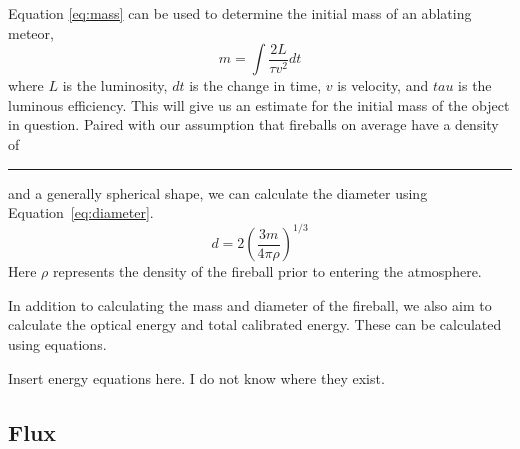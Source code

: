 Equation \ref{eq:mass} can be used to determine the initial mass of an ablating meteor,
\begin{equation}
m = \int \frac{2L}{\tau v^2} dt
\label{eq:mass}
\end{equation}
where $L$ is the luminosity, $dt$ is the change in time, $v$ is velocity, and $tau$ is the luminous efficiency. 
This will give us an estimate for the initial mass of the object in question.
Paired with our assumption that fireballs on average have a density of \rule{1cm}{.1pt} and a generally spherical shape, we can calculate the diameter using Equation~\ref{eq:diameter}.
\begin{equation}
d = 2(\frac{3m}{4\pi \rho})^{1/3}
\label{eq:diameter}
\end{equation}
Here $\rho$ represents the density of the fireball prior to entering the atmosphere.

In addition to calculating the mass and diameter of the fireball, we also aim to calculate the optical energy and total calibrated energy.
These can be calculated using equations.

Insert energy equations here.  I do not know where they exist.

\subsection{Flux}

